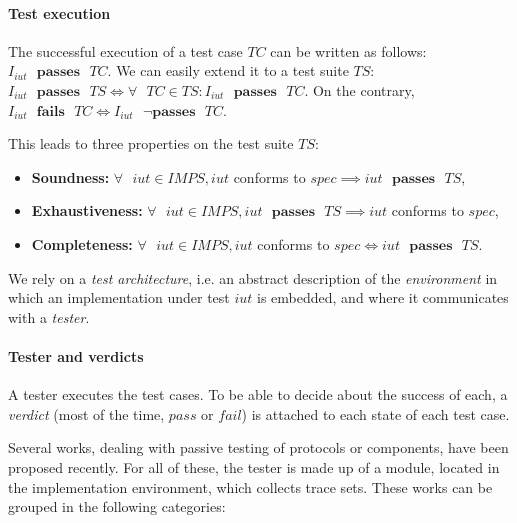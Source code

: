 \paragraph{Test execution} The successful execution of a test
case $TC$ can be written as follows: $I_{iut} \text{ }
\mathbf{passes} \text{ } TC$. We can easily extend it to a test
suite $TS$: $I_{iut} \text{ } \mathbf{passes} \text{ } TS
\Leftrightarrow \forall \text{ } TC \in TS : I_{iut} \text{ }
\mathbf{passes} \text{ } TC$. On the contrary, $I_{iut} \text{ }
\mathbf{fails} \text{ } TC \Leftrightarrow I_{iut} \text{ } \neg
\mathbf{passes} \text{ } TC$.

This leads to three properties on the test suite $TS$:

\begin{itemize}
\item \textbf{Soundness:} $\forall \text{ } iut \in IMPS, iut$
conforms to $spec \implies iut \text{ } \mathbf{passes} \text{ }
TS$,

\item \textbf{Exhaustiveness:} $\forall \text{ } iut \in IMPS,
iut \text{ } \mathbf{passes} \text{ } TS \implies iut$ conforms
to $spec$,

\item \textbf{Completeness:} $\forall \text{ } iut \in IMPS, iut$
conforms to $spec \Leftrightarrow iut \text{ } \mathbf{passes}
\text{ } TS$.
\end{itemize}

We rely on a \textit{test architecture}, i.e. an abstract
description of the \textit{environment} in which an
implementation under test $iut$ is embedded, and where it
communicates with a \textit{tester}.

\paragraph{Tester and verdicts} A tester executes the test cases.
To be able to decide about the success of each, a
\textit{verdict} (most of the time, $pass$ or $fail$) is attached
to each state of each test case.



Several works, dealing with passive testing of protocols or
components, have been proposed recently. For all of these, the
tester is made up of a module, located in the implementation
environment, which collects trace sets. These works can be
grouped in the following categories:

